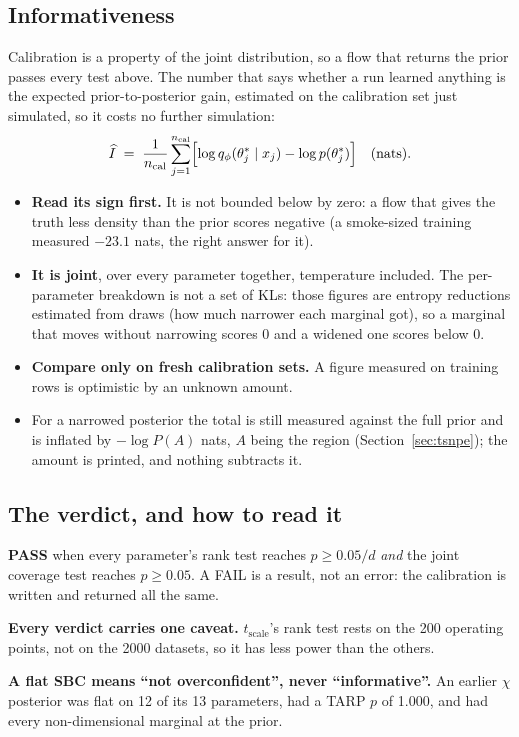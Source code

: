 \documentclass[10pt,a4paper]{article}
\newcommand{\tscale}{t_{\mathrm{scale}}}
\begin{document}
\subsection{Informativeness}

Calibration is a property of the joint distribution, so a flow that returns the prior passes every test above. The
number that says whether a run learned anything is the expected prior-to-posterior gain, estimated on the calibration set
just simulated, so it costs no further simulation:
\begin{equation}
\widehat{I}\;=\;\frac1{n_{\mathrm{cal}}}\sum_{j=1}^{n_{\mathrm{cal}}}
\Bigl[\log q_\phi(\theta^\ast_j\mid x_j)-\log p(\theta^\ast_j)\Bigr]\quad\text{(nats)}.
\end{equation}
\begin{itemize}[leftmargin=1.4em,itemsep=1pt,topsep=2pt]
  \item \textbf{Read its sign first.} It is not bounded below by zero: a flow that gives the truth less density than the
        prior scores negative (a smoke-sized training measured $-23.1$ nats, the right answer for it).
  \item \textbf{It is joint}, over every parameter together, temperature included. The per-parameter breakdown is not a
        set of KLs: those figures are entropy reductions estimated from draws (how much narrower each marginal got), so a
        marginal that moves without narrowing scores 0 and a widened one scores below 0.
  \item \textbf{Compare only on fresh calibration sets.} A figure measured on training rows is optimistic by an unknown
        amount.
  \item For a narrowed posterior the total is still measured against the full prior and is inflated by $-\log P(A)$ nats,
        $A$ being the region (Section~\ref{sec:tsnpe}); the amount is printed, and nothing subtracts it.
\end{itemize}

\subsection{The verdict, and how to read it}

\begin{keybox}[title={The calibration verdict}]
\textbf{PASS} when every parameter's rank test reaches $p\ge 0.05/d$ \emph{and} the joint coverage test reaches
$p\ge 0.05$. A FAIL is a result, not an error: the calibration is written and returned all the same.

\textbf{Every verdict carries one caveat.} $\tscale$'s rank test rests on the 200 operating points, not on the 2000
datasets, so it has less power than the others.

\textbf{A flat SBC means ``not overconfident'', never ``informative''.} An earlier $\chi$ posterior was flat on 12 of its 13
parameters, had a TARP $p$ of 1.000, and had every non-dimensional marginal at the prior.
\end{keybox}
\end{document}
